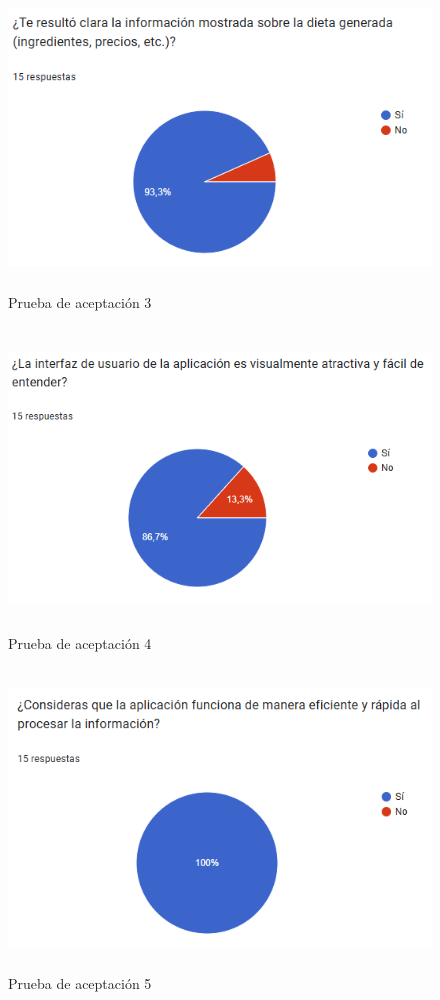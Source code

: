 \begin{figure}[H]
    \centering
    \includegraphics[height=8cm]{img/validacion/aceptacion3.png}
    \caption{Prueba de aceptaci\'on 3}
    \label{fig:aceptacion3}
\end{figure}

\begin{figure}[H]
    \centering
    \includegraphics[height=8cm]{img/validacion/aceptacion4.png}
    \caption{Prueba de aceptaci\'on 4}
    \label{fig:aceptacion4}
\end{figure}

\begin{figure}[H]
    \centering
    \includegraphics[height=8cm]{img/validacion/aceptacion5.png}
    \caption{Prueba de aceptaci\'on 5}
    \label{fig:aceptacion5}
\end{figure}

